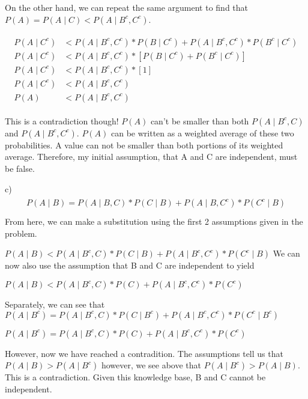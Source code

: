 \documentclass[11pt]{article}
\begin{document}
    On the other hand, we can repeat the same argument to find that $P(A) = P(A \mid C) < P(A \mid B^c,C^c)$.

    \begin{gather*}
    \begin{align*}
    P(A \mid C^c) &< P(A \mid B^c,C^c)*P(B \mid C^c) + P(A \mid B^c,C^c)*P(B^c \mid C^c)\\
    P(A \mid C^c) &< P(A \mid B^c,C^c)*[P(B \mid C^c) + P(B^c \mid C^c)]\\
    P(A \mid C^c) &< P(A \mid B^c,C^c)*[1]\\
    P(A \mid C^c) &< P(A \mid B^c,C^c)\\
    P(A) &< P(A \mid B^c,C^c)
    \end{align*}
    \end{gather*}

    This is a contradiction though! $P(A)$ can't be smaller than both $P(A \mid B^c,C)$ and $P(A \mid B^c,C^c)$.  $P(A)$ can be written as a weighted average of these two probabilities.  A value can not be smaller than both portions of its weighted average.  Therefore, my initial assumption, that A and C are independent, must be false.

\smallskip
    
    c) 
    \begin{gather*}
    \begin{align*}
    P(A \mid B) = P(A \mid B,C)*P(C \mid B) + P(A \mid B,C^c)*P(C^c \mid B)\\
    \end{align*}
    \end{gather*}
    From here, we can make a substitution using the first 2 assumptions given in the problem. 

    $P(A \mid B) < P(A \mid B^c,C)*P(C \mid B) + P(A \mid B^c,C^c)*P(C^c \mid B)$
    We can now also use the assumption that B and C are independent to yield

    $P(A \mid B) < P(A \mid B^c,C)*P(C) + P(A \mid B^c,C^c)*P(C^c)$

    Separately, we can see that 
    $P(A \mid B^c) = P(A \mid B^c, C)*P(C \mid B^c) + P(A \mid B^c, C^c)*P(C^c \mid B^c)$

    $P(A \mid B^c) = P(A \mid B^c, C)*P(C) + P(A \mid B^c, C^c)*P(C^c)$

    However, now we have reached a contradition.  The assumptions tell us that $P(A \mid B) > P(A \mid B^c)$ however, we see above that $P(A \mid B^c) > P(A \mid B)$.  This is a contradiction.  Given this knowledge base, B and C cannot be independent.
\end{document}
